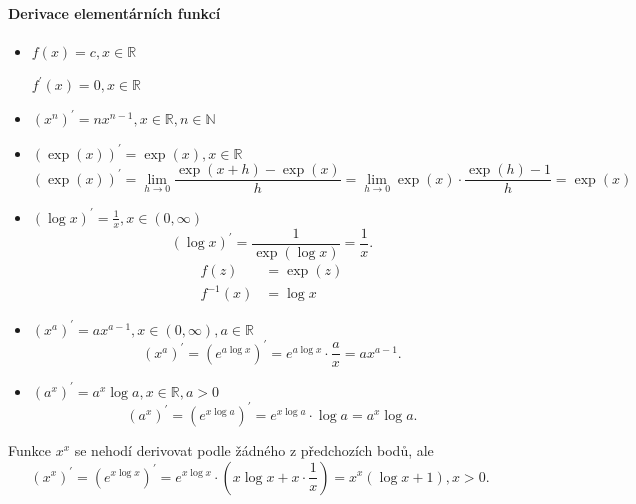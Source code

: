 \paragraph{Derivace elementárních funkcí}
\begin{itemize}
	\item $f(x)=c, x \in \mathbb R$
	\par $f^\prime(x) = 0, x \in \mathbb R $
	\item $\left( x^n \right )^\prime = nx^{n-1}, x \in \mathbb R , n \in \mathbb N  $
	\item $\left( \exp(x) \right )^\prime  = \exp(x), x \in \mathbb R $
	$$
 \left( \exp(x) \right )^\prime = \lim_{h\to 0} \frac{\exp(x+h)-\exp(x)}{h} = \lim_{h\to 0} \exp (x)\cdot \frac{\exp(h)-1}{h} = \exp(x)
	$$
	\item $(\log x)^\prime = \frac{1}{x}, x \in \left( 0,\infty \right ) $
	$$
	    (\log x)^\prime =\frac{1}{\exp(\log x)} = \frac{1}{x}.
	$$
	\begin{align*}
		f(z) &= \exp(z) \\
		f^{-1}(x) & = \log x
	\end{align*}
	\item $(x^a)^\prime = ax^{a-1}, x \in \left( 0,\infty \right ), a \in \mathbb R  $
	$$
 \left( x^a \right )^\prime = \left( e^{a \log x} \right )^\prime = e^{a\log x}\cdot \frac{a}{x} = ax^{a-1}.
	$$
	\item $\left( a^x \right )^\prime = a^x \log a, x \in \mathbb R , a > 0 $
	$$
 \left( a^x \right )^\prime = \left( e^{x\log a} \right )^\prime = e^{x\log a}\cdot \log a = a^x\log a.
	$$
\end{itemize}

\begin{poznamka}
	Funkce $x^x$ se nehodí derivovat podle žádného z předchozích bodů, ale
$$\left( x^x \right )^\prime = \left( e^{x\log x} \right )^\prime = e^{x\log x}\cdot \left (x\log x + x\cdot \frac{1}{x}\right ) = x^x (\log x +1), x > 0.  $$
\end{poznamka}

